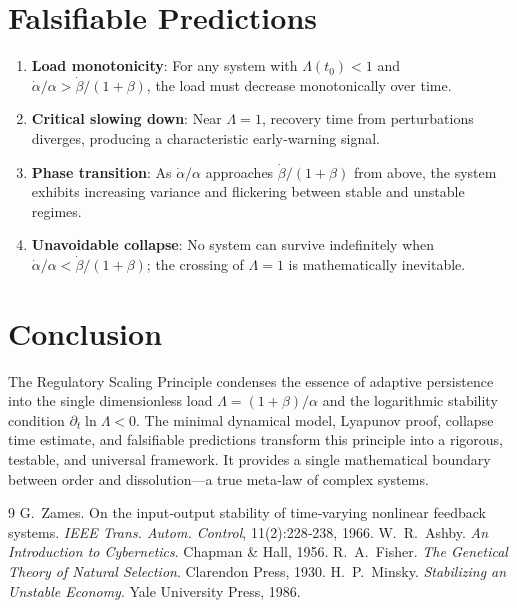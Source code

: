 \documentclass[11pt]{article}
\begin{document}
\section{Falsifiable Predictions}
\label{sec:falsifiable}
\begin{enumerate}[leftmargin=2em]
    \item \textbf{Load monotonicity}: For any system with \(\Lambda(t_0)<1\) and \(\dot\alpha/\alpha > \dot\beta/(1+\beta)\), the load must decrease monotonically over time.
    \item \textbf{Critical slowing down}: Near \(\Lambda=1\), recovery time from perturbations diverges, producing a characteristic early‑warning signal.
    \item \textbf{Phase transition}: As \(\dot\alpha/\alpha\) approaches \(\dot\beta/(1+\beta)\) from above, the system exhibits increasing variance and flickering between stable and unstable regimes.
    \item \textbf{Unavoidable collapse}: No system can survive indefinitely when \(\dot\alpha/\alpha < \dot\beta/(1+\beta)\); the crossing of \(\Lambda=1\) is mathematically inevitable.
\end{enumerate}

\section{Conclusion}
\label{sec:conclusion}
The Regulatory Scaling Principle condenses the essence of adaptive persistence into the single dimensionless load \(\Lambda = (1+\beta)/\alpha\) and the logarithmic stability condition \(\partial_t\ln\Lambda < 0\). The minimal dynamical model, Lyapunov proof, collapse time estimate, and falsifiable predictions transform this principle into a rigorous, testable, and universal framework. It provides a single mathematical boundary between order and dissolution—a true meta‑law of complex systems.

\begin{thebibliography}{9}
G.~Zames.
\newblock On the input‑output stability of time‑varying nonlinear feedback systems.
\newblock \emph{IEEE Trans. Autom. Control}, 11(2):228‑238, 1966.
W.~R.~Ashby.
\newblock \emph{An Introduction to Cybernetics}. Chapman \& Hall, 1956.
R.~A.~Fisher.
\newblock \emph{The Genetical Theory of Natural Selection}. Clarendon Press, 1930.
H.~P.~Minsky.
\newblock \emph{Stabilizing an Unstable Economy}. Yale University Press, 1986.
\end{thebibliography}
\end{document}
